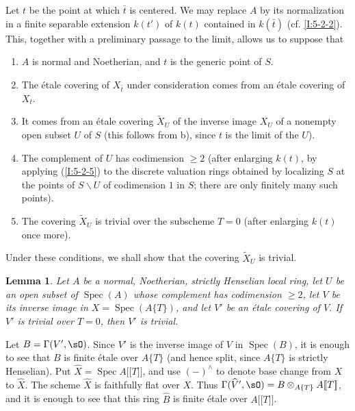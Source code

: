 \documentclass[12pt,oneside,english]{smfbook}
\DeclareMathOperator{\spec}{Spec}
\providecommand{\llbracket}{\mathopen{[\![}}
\providecommand{\rrbracket}{\mathclose{]\!]}}
\renewcommand{\setminus}{\smallsetminus}
\newtheorem{lemma}[subsubsection]{Lemma}
\begin{document}
Let $t$ be the point at which $\bar t$ is centered. We may replace $A$ by its normalization in a finite separable extension $k(t')$ of $k(t)$ contained in $k(\bar t)$ (cf. \ref{I:5-2-2}). This, together with a preliminary passage to the limit, allows us to suppose that
\begin{enumerate}[\indent a)]
  \item $A$ is normal and Noetherian, and $t$ is the generic point of $S$.
  \item The étale covering of $X_{\bar t}$ under consideration comes from an étale covering of $X_t$.
  \item It comes from an étale covering $\widetilde X_U$ of the inverse image $X_U$ of a nonempty open subset $U$ of $S$ (this follows from b), since $t$ is the limit of the $U$).
  \item The complement of $U$ has codimension $\geqslant2$ (after enlarging $k(t)$, by applying (\ref{I:5-2-5}) to the discrete valuation rings obtained by localizing $S$ at the points of $S\setminus U$ of codimension $1$ in $S$; there are only finitely many such points).
  \item The covering $\widetilde X_U$ is trivial over the subscheme $T=0$ (after enlarging $k(t)$ once more).
\end{enumerate}

Under these conditions, we shall show that the covering $\widetilde X_U$ is trivial.

\begin{lemma}\label{I:5-2-7} %
Let $A$ be a normal, Noetherian, strictly Henselian local ring, let $U$ be an open subset of $\spec(A)$ whose complement has codimension $\geqslant2$, let $V$ be its inverse image in $X=\spec(A\{T\})$, and let $V'$ be an étale covering of $V$. If $V'$ is trivial over $T=0$, then $V'$ is trivial.
\end{lemma}

Let $B=\Gamma(V',\sO)$. Since $V'$ is the inverse image of $V$ in $\spec(B)$, it is enough to see that $B$ is finite étale over $A\{T\}$ (and hence split, since $A\{T\}$ is strictly Henselian). Put $\widehat X=\spec A\llbracket T\rrbracket$, and use $(-)^\wedge$ to denote base change from $X$ to $\widehat X$. The scheme $\widehat X$ is faithfully flat over $X$. Thus $\Gamma(\widehat V',\sO)=B\otimes_{A\{T\}}A\llbracket T\rrbracket$, and it is enough to see that this ring $\widehat B$ is finite étale over $A\llbracket T\rrbracket$.
\end{document}
